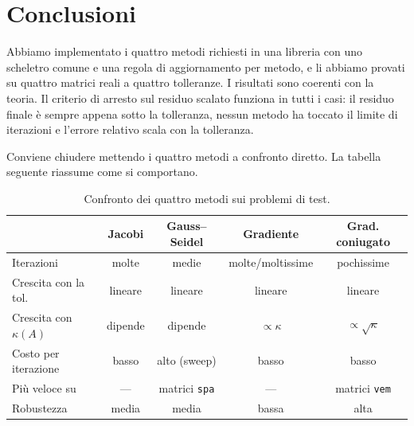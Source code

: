 \documentclass[11pt,a4paper]{article}
\begin{document}
\section{Conclusioni}\label{sec:conclusioni}
Abbiamo implementato i quattro metodi richiesti in una libreria con uno scheletro
comune e una regola di aggiornamento per metodo, e li abbiamo provati su quattro
matrici reali a quattro tolleranze. I risultati sono coerenti con la teoria. Il
criterio di arresto sul residuo scalato funziona in tutti i casi: il residuo
finale è sempre appena sotto la tolleranza, nessun metodo ha toccato il limite di
iterazioni e l'errore relativo scala con la tolleranza.

Conviene chiudere mettendo i quattro metodi a confronto diretto. La tabella
seguente riassume come si comportano.

\begin{table}[H]
\centering
\caption{Confronto dei quattro metodi sui problemi di test.}
\label{tab:confronto}
\small
\begin{tabular}{lcccc}
\toprule
 & Jacobi & Gauss--Seidel & Gradiente & Grad. coniugato \\
\midrule
Iterazioni & molte & medie & molte/moltissime & pochissime \\
Crescita con la tol. & lineare & lineare & lineare & lineare \\
Crescita con $\kappa(A)$ & dipende & dipende & $\propto\kappa$ & $\propto\sqrt{\kappa}$ \\
Costo per iterazione & basso & alto (sweep) & basso & basso \\
Più veloce su & --- & matrici \texttt{spa} & --- & matrici \texttt{vem} \\
Robustezza & media & media & bassa & alta \\
\bottomrule
\end{tabular}
\end{table}
\end{document}
